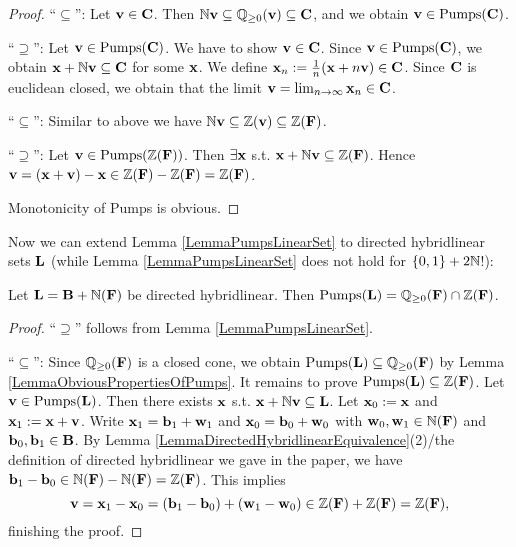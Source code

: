\begin{proof}
``\(\subseteq\)'': Let \(\mathbf{v} \in \mathbf{C}\). Then \(\mathbb{N} \mathbf{v} \subseteq \mathbb{Q}_{\geq 0}(\mathbf{v}) \subseteq \mathbf{C}\), and we obtain \(\mathbf{v} \in \operatorname{Pumps}(\mathbf{C})\).

``\(\supseteq\)'': Let \(\mathbf{v} \in \operatorname{Pumps}(\mathbf{C})\). We have to show \(\mathbf{v} \in \mathbf{C}\). Since \(\mathbf{v} \in \operatorname{Pumps}(\mathbf{C})\), we obtain \(\mathbf{x}+\mathbb{N} \mathbf{v} \subseteq \mathbf{C}\) for some \(\mathbf{x}\). We define \(\mathbf{x}_n:=\frac{1}{n}(\mathbf{x}+n \mathbf{v}) \in \mathbf{C}\). Since \(\mathbf{C}\) is euclidean closed, we obtain that the limit \(\mathbf{v}=\lim_{n \to \infty} \mathbf{x}_n \in \mathbf{C}\).

``\(\subseteq\)'': Similar to above we have \(\mathbb{N} \mathbf{v} \subseteq \mathbb{Z}(\mathbf{v}) \subseteq \mathbb{Z}(\mathbf{F})\).

``\(\supseteq\)'': Let \(\mathbf{v} \in \operatorname{Pumps}(\mathbb{Z}(\mathbf{F}))\). Then \(\exists \mathbf{x}\) s.t. \(\mathbf{x}+\mathbb{N} \mathbf{v} \subseteq \mathbb{Z}(\mathbf{F})\). Hence \(\mathbf{v}=(\mathbf{x}+\mathbf{v})-\mathbf{x} \in \mathbb{Z}(\mathbf{F})-\mathbb{Z}(\mathbf{F})=\mathbb{Z}(\mathbf{F})\).

Monotonicity of Pumps is obvious.
\end{proof}

Now we can extend Lemma \ref{LemmaPumpsLinearSet} to directed hybridlinear sets \(\mathbf{L}\) (while Lemma \ref{LemmaPumpsLinearSet} does not hold for \(\{0,1\}+2\mathbb{N}\)!):

\begin{lemma} \label{LemmaPumpsDirectedHybridlinear}
Let \(\mathbf{L}=\mathbf{B}+\mathbb{N}(\mathbf{F})\) be directed hybridlinear. Then \(\operatorname{Pumps}(\mathbf{L})=\mathbb{Q}_{\geq 0}(\mathbf{F}) \cap \mathbb{Z}(\mathbf{F})\).
\end{lemma}

\begin{proof}
``\(\supseteq\)'' follows from Lemma \ref{LemmaPumpsLinearSet}.

``\(\subseteq\)'': Since \(\mathbb{Q}_{\geq 0}(\mathbf{F})\) is a closed cone, we obtain \(\operatorname{Pumps}(\mathbf{L}) \subseteq \mathbb{Q}_{\geq 0}(\mathbf{F})\) by Lemma \ref{LemmaObviousPropertiesOfPumps}. It remains to prove \(\operatorname{Pumps}(\mathbf{L}) \subseteq \mathbb{Z}(\mathbf{F})\). Let \(\mathbf{v} \in \operatorname{Pumps}(\mathbf{L})\). Then there exists \(\mathbf{x}\) s.t. \(\mathbf{x}+\mathbb{N} \mathbf{v} \subseteq \mathbf{L}\). Let \(\mathbf{x}_0:=\mathbf{x}\) and \(\mathbf{x}_1:=\mathbf{x}+\mathbf{v}\). Write \(\mathbf{x}_1=\mathbf{b}_1+\mathbf{w}_1\) and \(\mathbf{x}_0=\mathbf{b}_0+\mathbf{w}_0\) with \(\mathbf{w}_0, \mathbf{w}_1 \in \mathbb{N}(\mathbf{F})\) and \(\mathbf{b}_0, \mathbf{b}_1 \in \mathbf{B}\). By Lemma \ref{LemmaDirectedHybridlinearEquivalence}(2)/the definition of directed hybridlinear we gave in the paper, we have \(\mathbf{b}_1-\mathbf{b}_0 \in \mathbb{N}(\mathbf{F})-\mathbb{N}(\mathbf{F})=\mathbb{Z}(\mathbf{F})\). This implies 
\[\mathbf{v}=\mathbf{x}_1-\mathbf{x}_0=(\mathbf{b}_1-\mathbf{b}_0)+(\mathbf{w}_1-\mathbf{w}_0) \in \mathbb{Z}(\mathbf{F})+\mathbb{Z}(\mathbf{F})=\mathbb{Z}(\mathbf{F}),\]
finishing the proof.
\end{proof}

